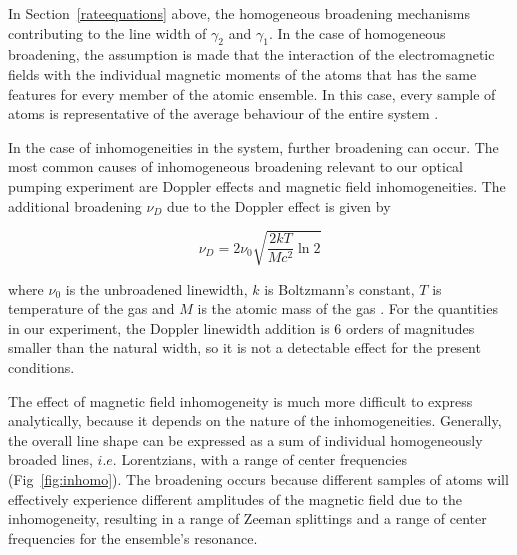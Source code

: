 In Section~\ref{rateequations} above, the homogeneous broadening
mechanisms contributing to the line width of $\gamma_2$ and
$\gamma_1$. In the case of homogeneous broadening, the assumption is
made that the interaction of the electromagnetic fields with the
individual magnetic moments of the atoms that has the same features
for every member of the atomic ensemble. In this case, every sample of
atoms is representative of the average behaviour of the entire system
\cite{vanier}. 

In the case of inhomogeneities in the system, further broadening can
occur. The most common causes of inhomogeneous broadening relevant to
our optical pumping experiment are Doppler effects and magnetic field
inhomogeneities. The additional broadening $\nu_D$ due to the Doppler effect
is given by

\begin{equation}
\nu_D = 2\nu_0\sqrt{\frac{2 k T}{M c^2}\ln{2}}
\end{equation}

where $\nu_0$ is the unbroadened linewidth, $k$ is Boltzmann's
constant, $T$ is temperature of the gas and $M$ is the atomic mass of
the gas \cite{yariv}. For the quantities in our experiment, the
Doppler linewidth addition is $6$ orders of magnitudes smaller than
the natural width, so it is not a detectable effect for the present
conditions.

The effect of magnetic field inhomogeneity is much more difficult to
express analytically, because it depends on the nature of the
inhomogeneities. Generally, the overall line shape can be expressed as
a sum of individual homogeneously broaded lines, $i.e.$ Lorentzians,
with a range of center frequencies
(Fig~\ref{fig:inhomo})\cite{vanier}. The broadening occurs because
different samples of atoms will effectively experience different
amplitudes of the magnetic field due to the inhomogeneity,
resulting in a range of Zeeman splittings and a range of center
frequencies for the ensemble's resonance.

